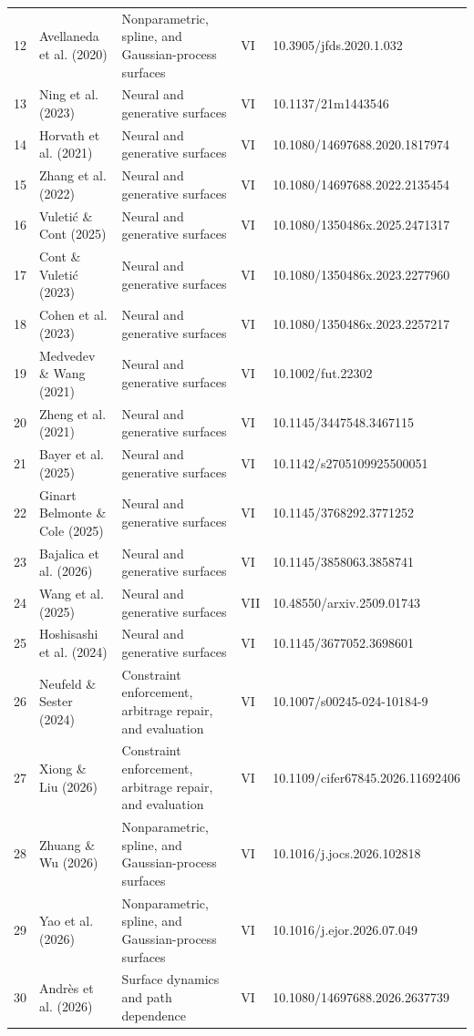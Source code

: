 \documentclass[11pt]{article}
\begin{document}
\begin{longtable}{@{}p{}p{}p{}p{}p{}@{}}
12 & Avellaneda et al. (2020) & Nonparametric, spline, and Gaussian-process surfaces & VI & 10.3905/jfds.2020.1.032 \\
13 & Ning et al. (2023) & Neural and generative surfaces & VI & 10.1137/21m1443546 \\
14 & Horvath et al. (2021) & Neural and generative surfaces & VI & 10.1080/14697688.2020.1817974 \\
15 & Zhang et al. (2022) & Neural and generative surfaces & VI & 10.1080/14697688.2022.2135454 \\
16 & Vuletić \& Cont (2025) & Neural and generative surfaces & VI & 10.1080/1350486x.2025.2471317 \\
17 & Cont \& Vuletić (2023) & Neural and generative surfaces & VI & 10.1080/1350486x.2023.2277960 \\
18 & Cohen et al. (2023) & Neural and generative surfaces & VI & 10.1080/1350486x.2023.2257217 \\
19 & Medvedev \& Wang (2021) & Neural and generative surfaces & VI & 10.1002/fut.22302 \\
20 & Zheng et al. (2021) & Neural and generative surfaces & VI & 10.1145/3447548.3467115 \\
21 & Bayer et al. (2025) & Neural and generative surfaces & VI & 10.1142/s2705109925500051 \\
22 & Ginart Belmonte \& Cole (2025) & Neural and generative surfaces & VI & 10.1145/3768292.3771252 \\
23 & Bajalica et al. (2026) & Neural and generative surfaces & VI & 10.1145/3858063.3858741 \\
24 & Wang et al. (2025) & Neural and generative surfaces & VII & 10.48550/arxiv.2509.01743 \\
25 & Hoshisashi et al. (2024) & Neural and generative surfaces & VI & 10.1145/3677052.3698601 \\
26 & Neufeld \& Sester (2024) & Constraint enforcement, arbitrage repair, and evaluation & VI & 10.1007/s00245-024-10184-9 \\
27 & Xiong \& Liu (2026) & Constraint enforcement, arbitrage repair, and evaluation & VI & 10.1109/cifer67845.2026.11692406 \\
28 & Zhuang \& Wu (2026) & Nonparametric, spline, and Gaussian-process surfaces & VI & 10.1016/j.jocs.2026.102818 \\
29 & Yao et al. (2026) & Nonparametric, spline, and Gaussian-process surfaces & VI & 10.1016/j.ejor.2026.07.049 \\
30 & Andrès et al. (2026) & Surface dynamics and path dependence & VI & 10.1080/14697688.2026.2637739 \\

\end{longtable}
\end{document}
